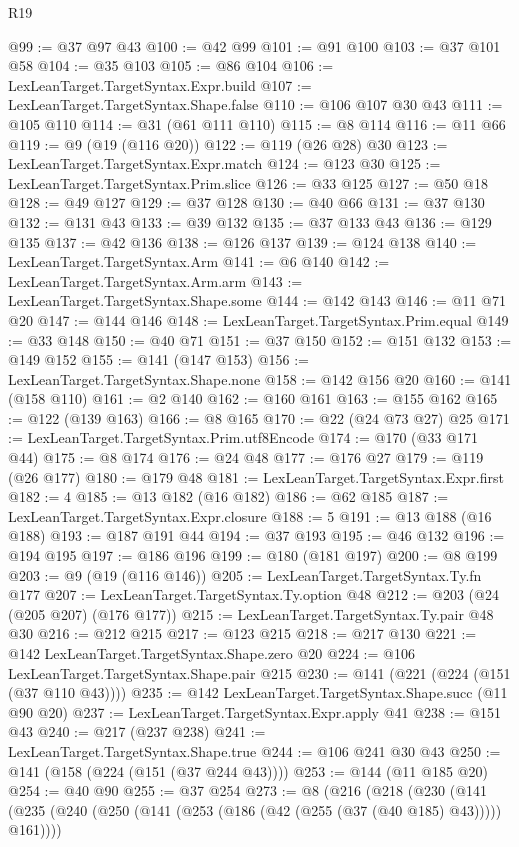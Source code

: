 \begin{lexlean}{R19}
\begin{coremodule}
@99 := @37 @97 @43
@100 := @42 @99
@101 := @91 @100
@103 := @37 @101 @58
@104 := @35 @103
@105 := @86 @104
@106 := LexLeanTarget.TargetSyntax.Expr.build
@107 := LexLeanTarget.TargetSyntax.Shape.false
@110 := @106 @107 @30 @43
@111 := @105 @110
@114 := @31 (@61 @111 @110)
@115 := @8 @114
@116 := @11 @66
@119 := @9 (@19 (@116 @20))
@122 := @119 (@26 @28) @30
@123 := LexLeanTarget.TargetSyntax.Expr.match
@124 := @123 @30
@125 := LexLeanTarget.TargetSyntax.Prim.slice
@126 := @33 @125
@127 := @50 @18
@128 := @49 @127
@129 := @37 @128
@130 := @40 @66
@131 := @37 @130
@132 := @131 @43
@133 := @39 @132
@135 := @37 @133 @43
@136 := @129 @135
@137 := @42 @136
@138 := @126 @137
@139 := @124 @138
@140 := LexLeanTarget.TargetSyntax.Arm
@141 := @6 @140
@142 := LexLeanTarget.TargetSyntax.Arm.arm
@143 := LexLeanTarget.TargetSyntax.Shape.some
@144 := @142 @143
@146 := @11 @71 @20
@147 := @144 @146
@148 := LexLeanTarget.TargetSyntax.Prim.equal
@149 := @33 @148
@150 := @40 @71
@151 := @37 @150
@152 := @151 @132
@153 := @149 @152
@155 := @141 (@147 @153)
@156 := LexLeanTarget.TargetSyntax.Shape.none
@158 := @142 @156 @20
@160 := @141 (@158 @110)
@161 := @2 @140
@162 := @160 @161
@163 := @155 @162
@165 := @122 (@139 @163)
@166 := @8 @165
@170 := @22 (@24 @73 @27) @25
@171 := LexLeanTarget.TargetSyntax.Prim.utf8Encode
@174 := @170 (@33 @171 @44)
@175 := @8 @174
@176 := @24 @48
@177 := @176 @27
@179 := @119 (@26 @177)
@180 := @179 @48
@181 := LexLeanTarget.TargetSyntax.Expr.first
@182 := 4
@185 := @13 @182 (@16 @182)
@186 := @62 @185
@187 := LexLeanTarget.TargetSyntax.Expr.closure
@188 := 5
@191 := @13 @188 (@16 @188)
@193 := @187 @191 @44
@194 := @37 @193
@195 := @46 @132
@196 := @194 @195
@197 := @186 @196
@199 := @180 (@181 @197)
@200 := @8 @199
@203 := @9 (@19 (@116 @146))
@205 := LexLeanTarget.TargetSyntax.Ty.fn @177
@207 := LexLeanTarget.TargetSyntax.Ty.option @48
@212 := @203 (@24 (@205 @207) (@176 @177))
@215 := LexLeanTarget.TargetSyntax.Ty.pair @48 @30
@216 := @212 @215
@217 := @123 @215
@218 := @217 @130
@221 := @142 LexLeanTarget.TargetSyntax.Shape.zero @20
@224 := @106 LexLeanTarget.TargetSyntax.Shape.pair @215
@230 := @141 (@221 (@224 (@151 (@37 @110 @43))))
@235 := @142 LexLeanTarget.TargetSyntax.Shape.succ (@11 @90 @20)
@237 := LexLeanTarget.TargetSyntax.Expr.apply @41
@238 := @151 @43
@240 := @217 (@237 @238)
@241 := LexLeanTarget.TargetSyntax.Shape.true
@244 := @106 @241 @30 @43
@250 := @141 (@158 (@224 (@151 (@37 @244 @43))))
@253 := @144 (@11 @185 @20)
@254 := @40 @90
@255 := @37 @254
@273 := @8
    (@216
      (@218
        (@230
          (@141
            (@235 (@240 (@250 (@141 (@253 (@186 (@42 (@255 (@37 (@40 @185) @43))))) @161))))

\end{coremodule}
\end{lexlean}
